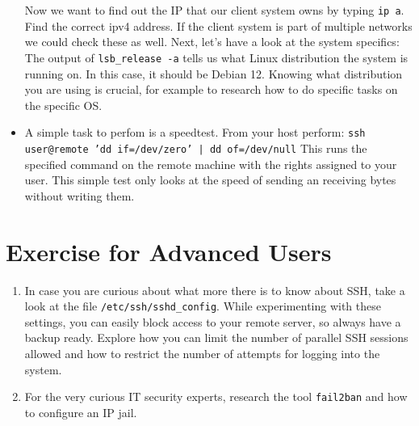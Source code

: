 \documentclass{dcbl/challenge}
\begin{document}
\begin{aufgabe}
\begin{itemize}
        Now we want to find out the IP that our client system owns by typing \texttt{ip a}. Find the correct ipv4 address. If the client system is part of multiple networks we could check these as well. 
        Next, let's have a look at the system specifics: The output of \texttt{lsb\_release -a} tells us what Linux distribution the system is running on. In this case, it should be Debian 12.
        Knowing what distribution you are using is crucial, for example to research how to do specific tasks on the specific OS.
    \item A simple task to perfom is a speedtest. From your host perform: \texttt{ssh user@remote 'dd if=/dev/zero' | dd of=/dev/null} This runs the specified command on the remote machine with the rights assigned to your user. This simple test only looks at the speed of sending an receiving bytes without writing them.
    
\end{itemize}
\end{aufgabe}

\section*{Exercise for Advanced Users}
\begin{enumerate}
    \item In case you are curious about what more there is to know about SSH, take a look at the file \texttt{/etc/ssh/sshd\_config}. While experimenting with these settings, you can easily block access to your remote server, so always have a backup ready. Explore how you can limit the number of parallel SSH sessions allowed and how to restrict the number of attempts for logging into the system.

    \item For the very curious IT security experts, research the tool \texttt{fail2ban} and how to configure an IP jail.
\end{enumerate}
\end{document}
